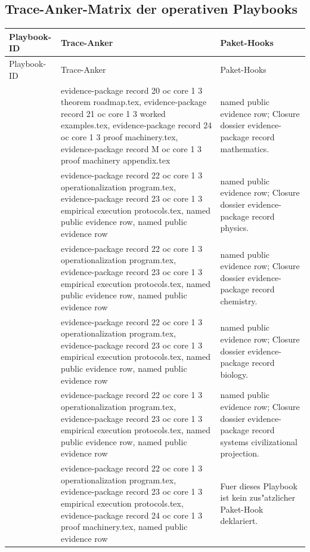 \subsection{Trace-Anker-Matrix der operativen Playbooks}
\begin{longtable}{@{}L{0.16\textwidth}L{0.38\textwidth}L{0.34\textwidth}@{}}
\toprule
Playbook-ID & Trace-Anker & Paket-Hooks \\
\midrule
\endfirsthead
\toprule
Playbook-ID & Trace-Anker & Paket-Hooks \\
\midrule
\endhead
{} & evidence-package record 20 oc core 1 3 theorem roadmap.tex, \allowbreak evidence-package record 21 oc core 1 3 worked examples.tex, \allowbreak evidence-package record 24 oc core 1 3 proof machinery.tex, \allowbreak evidence-package record M oc core 1 3 proof machinery appendix.tex & named public evidence row; Closure dossier evidence-package record mathematics. \\
 & evidence-package record 22 oc core 1 3 operationalization program.tex, \allowbreak evidence-package record 23 oc core 1 3 empirical execution protocols.tex, named public evidence row, named public evidence row & named public evidence row; Closure dossier evidence-package record physics. \\
 & evidence-package record 22 oc core 1 3 operationalization program.tex, \allowbreak evidence-package record 23 oc core 1 3 empirical execution protocols.tex, named public evidence row, named public evidence row & named public evidence row; Closure dossier evidence-package record chemistry. \\
 & evidence-package record 22 oc core 1 3 operationalization program.tex, \allowbreak evidence-package record 23 oc core 1 3 empirical execution protocols.tex, named public evidence row, named public evidence row & named public evidence row; Closure dossier evidence-package record biology. \\
 & evidence-package record 22 oc core 1 3 operationalization program.tex, \allowbreak evidence-package record 23 oc core 1 3 empirical execution protocols.tex, named public evidence row, named public evidence row & named public evidence row; Closure dossier evidence-package record systems civilizational projection. \\
 & evidence-package record 22 oc core 1 3 operationalization program.tex, \allowbreak evidence-package record 23 oc core 1 3 empirical execution protocols.tex, \allowbreak evidence-package record 24 oc core 1 3 proof machinery.tex, named public evidence row & Fuer dieses Playbook ist kein zus"atzlicher Paket-Hook deklariert. \\
\bottomrule
\end{longtable}

